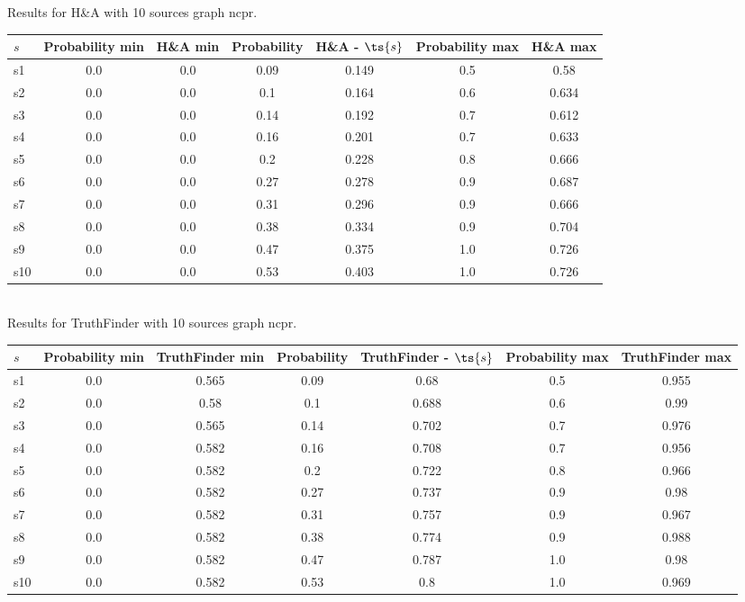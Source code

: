 \documentclass{article}
\begin{document}
\noindent Results for H\&A with 10 sources graph ncpr.

\noindent\begin{tabular}{|l|c|c|c|c|c|c|}
\hline
$s$& Probability min & H\&A min & Probability & H\&A - $\ts{s}$ & Probability max & H\&A max\\
\hline
s1 &0.0 & 0.0 & 0.09 & 0.149 & 0.5 & 0.58\\
\hline
s2 &0.0 & 0.0 & 0.1 & 0.164 & 0.6 & 0.634\\
\hline
s3 &0.0 & 0.0 & 0.14 & 0.192 & 0.7 & 0.612\\
\hline
s4 &0.0 & 0.0 & 0.16 & 0.201 & 0.7 & 0.633\\
\hline
s5 &0.0 & 0.0 & 0.2 & 0.228 & 0.8 & 0.666\\
\hline
s6 &0.0 & 0.0 & 0.27 & 0.278 & 0.9 & 0.687\\
\hline
s7 &0.0 & 0.0 & 0.31 & 0.296 & 0.9 & 0.666\\
\hline
s8 &0.0 & 0.0 & 0.38 & 0.334 & 0.9 & 0.704\\
\hline
s9 &0.0 & 0.0 & 0.47 & 0.375 & 1.0 & 0.726\\
\hline
s10 &0.0 & 0.0 & 0.53 & 0.403 & 1.0 & 0.726\\
\hline
\end{tabular}\\

\noindent Results for TruthFinder with 10 sources graph ncpr.

\noindent\begin{tabular}{|l|c|c|c|c|c|c|}
\hline
$s$& Probability min & TruthFinder min & Probability & TruthFinder - $\ts{s}$ & Probability max & TruthFinder max\\
\hline
s1 &0.0 & 0.565 & 0.09 & 0.68 & 0.5 & 0.955\\
\hline
s2 &0.0 & 0.58 & 0.1 & 0.688 & 0.6 & 0.99\\
\hline
s3 &0.0 & 0.565 & 0.14 & 0.702 & 0.7 & 0.976\\
\hline
s4 &0.0 & 0.582 & 0.16 & 0.708 & 0.7 & 0.956\\
\hline
s5 &0.0 & 0.582 & 0.2 & 0.722 & 0.8 & 0.966\\
\hline
s6 &0.0 & 0.582 & 0.27 & 0.737 & 0.9 & 0.98\\
\hline
s7 &0.0 & 0.582 & 0.31 & 0.757 & 0.9 & 0.967\\
\hline
s8 &0.0 & 0.582 & 0.38 & 0.774 & 0.9 & 0.988\\
\hline
s9 &0.0 & 0.582 & 0.47 & 0.787 & 1.0 & 0.98\\
\hline
s10 &0.0 & 0.582 & 0.53 & 0.8 & 1.0 & 0.969\\
\hline
\end{tabular}\\
\end{document}
